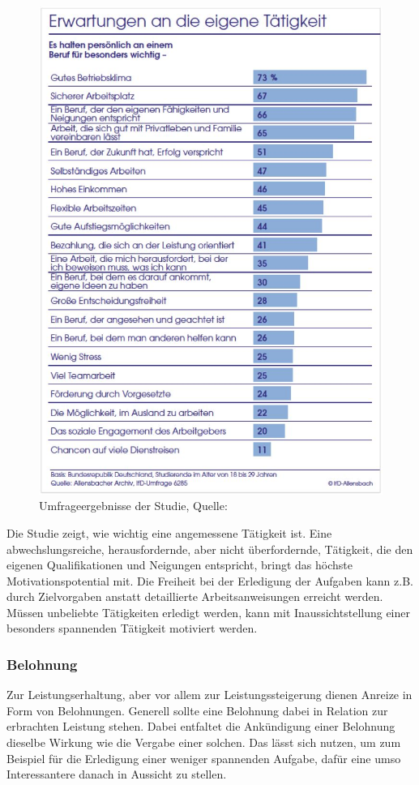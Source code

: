 \begin{figure}[!h]
\centering
\includegraphics[width=0.8\linewidth]{grafiken/abb4.jpg}
\caption{Umfrageergebnisse der Studie, \newline Quelle: \cite[S. 53]{Allensbach.2014}}
\label{fig:Gehirn4}
\end{figure}

Die Studie zeigt, wie wichtig eine angemessene Tätigkeit ist. Eine abwechslungsreiche, herausfordernde, aber nicht überfordernde, Tätigkeit, die den eigenen Qualifikationen und Neigungen entspricht, bringt das höchste Motivationspotential mit. 
Die Freiheit bei der Erledigung der Aufgaben kann z.B. durch Zielvorgaben anstatt detaillierte Arbeitsanweisungen erreicht werden. 
Müssen unbeliebte Tätigkeiten erledigt werden, kann mit Inaussichtstellung einer besonders spannenden Tätigkeit motiviert werden. 

\subsubsection{Belohnung}
Zur Leistungserhaltung, aber vor allem zur Leistungssteigerung dienen Anreize in Form von Belohnungen. Generell sollte eine Belohnung dabei in Relation zur erbrachten Leistung stehen. Dabei entfaltet die Ankündigung einer Belohnung dieselbe Wirkung wie die Vergabe einer solchen. Das lässt sich nutzen, um zum Beispiel für die Erledigung einer weniger spannenden Aufgabe, dafür eine umso Interessantere danach in Aussicht zu stellen. 

